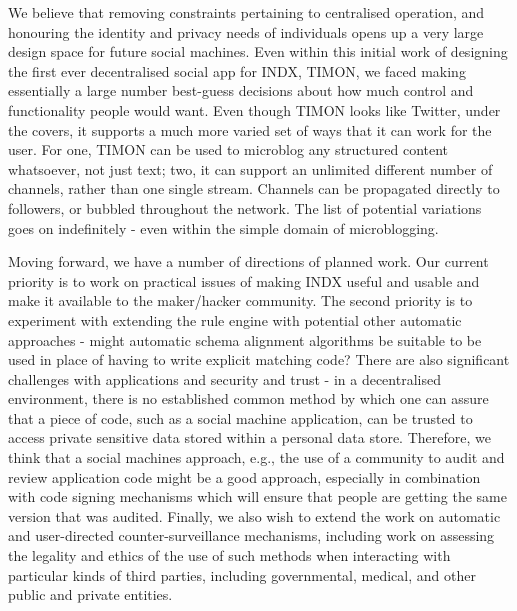 \documentclass{sig-alternate}
\begin{document}
We believe that removing constraints pertaining to centralised operation, and honouring the identity and privacy needs of individuals opens up a very large design space for future social machines.  Even within this initial work of designing the first ever decentralised social app for INDX, TIMON, we faced making essentially a large number best-guess decisions about how much control and functionality people would want.  Even though TIMON looks like Twitter, under the covers, it supports a much more varied set of ways that it can work for the user.  For one, TIMON can be used to microblog any structured content whatsoever, not just text; two, it can support an unlimited different number of channels, rather than one single stream.  Channels can be propagated directly to followers, or bubbled throughout the network.  The list of potential variations goes on indefinitely - even within the simple domain of microblogging.

Moving forward, we have a number of directions of planned work.  Our current priority is to work on practical issues of making INDX useful and usable and make it available to the maker/hacker community. The second priority is to experiment with extending the rule engine with potential other automatic approaches - might automatic schema alignment algorithms be suitable to be used in place of having to write explicit matching code?  There are also significant challenges with applications and security and trust - in a decentralised environment, there is no established common method by which one can assure that a piece of code, such as a social machine application, can be trusted to access private sensitive data stored within a personal data store.  Therefore, we think that a social machines approach, e.g., the use of a community to audit and review application code might be a good approach, especially in combination with code signing mechanisms which will ensure that people are getting the same version that was audited. Finally, we also wish to extend the work on automatic and user-directed counter-surveillance mechanisms, including work on assessing the legality and ethics of the use of such methods when interacting with particular kinds of third parties, including governmental, medical, and other public and private entities.



\end{document}
